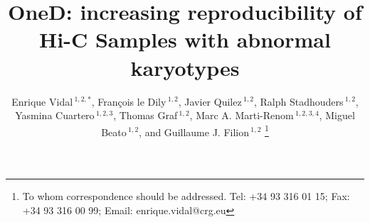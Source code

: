 \documentclass[a4,center,fleqn]{NAR}
\providecommand{\DIFadd}[1]{{\protect\color{red}#1}} %
\providecommand{\DIFdel}[1]{{\protect}}                      %
\providecommand{\DIFaddbegin}{} %
\providecommand{\DIFaddend}{} %
\providecommand{\DIFdelbegin}{} %
\providecommand{\DIFdelend}{} %
\begin{document}
\title{OneD: increasing reproducibility of Hi-C Samples with abnormal
karyotypes}

\author{%
Enrique Vidal\,$^{1,2,*}$,
Fran\c{c}ois le Dily\,$^{1,2}$,
Javier Quilez\,$^{1,2}$,
Ralph Stadhouders\,$^{1,2}$,
Yasmina Cuartero\,$^{1,2,3}$,
Thomas Graf\,$^{1,2}$,
Marc A.  \DIFdelbegin \DIFdel{Mart\'i-Renom}\DIFdelend \DIFaddbegin \DIFadd{Marti-Renom}\DIFaddend \,$^{1,2,3,4}$,
Miguel Beato\,$^{1,2}$,
and Guillaume J. Filion\,$^{1,2}$%
\footnote{To whom correspondence should be addressed.
Tel: +34 93 316 01 15; Fax: +34 93 316 00 99; Email: enrique.vidal@crg.eu}}

\DIFdelbegin %
\DIFdelend \DIFaddbegin \address{%
$^{1}$Gene Regulation, Stem Cells and Cancer Program, Centre for
Genomic Regulation (CRG), The Barcelona Institute of Science and
Technology (BIST), Dr. Aiguader 88, 08003, Barcelona, Spain
and
$^{2}$Universitat Pompeu Fabra (UPF), Barcelona, Spain
and
$^{3}$CNAG-CRG, Centre for Genomic Regulation (CRG), Barcelona
Institute of Science and Technology (BIST), Baldiri i Reixac 4, 08028
Barcelona, Spain
and
$^{4}$ICREA, Pg. Llu\'is Companys 23, 08010 Barcelona, Spain}
\DIFaddend 



\maketitle
\end{document}
